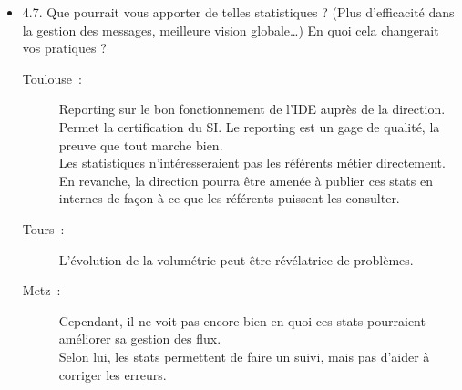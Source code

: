 \begin{itemize}
	  \item 4.7. Que pourrait vous apporter de telles statistiques ? (Plus
	  d’efficacité dans la gestion des messages, meilleure vision globale…) En quoi
	  cela changerait vos pratiques ?
	  \begin{description}
	  	\item[Toulouse~:] Reporting sur le bon fonctionnement de l’IDE auprès de la
	  	direction. Permet la certification du SI. Le reporting est un gage de
	  	qualité, la preuve que tout marche bien.\\
		Les statistiques n’intéresseraient pas les référents métier directement. En
		revanche, la direction pourra être amenée à publier ces stats en internes de
		façon à ce que les référents puissent les consulter.
	  	\item[Tours~:] L’évolution de la volumétrie peut être révélatrice de
	  	problèmes.
	  	\item[Metz~:] Cependant, il ne voit pas encore bien en quoi ces stats
	  	pourraient améliorer sa gestion des flux.\\
		Selon lui, les stats permettent de faire un suivi, mais pas d’aider à corriger
		les erreurs.
	  \end{description}
	\end{itemize}